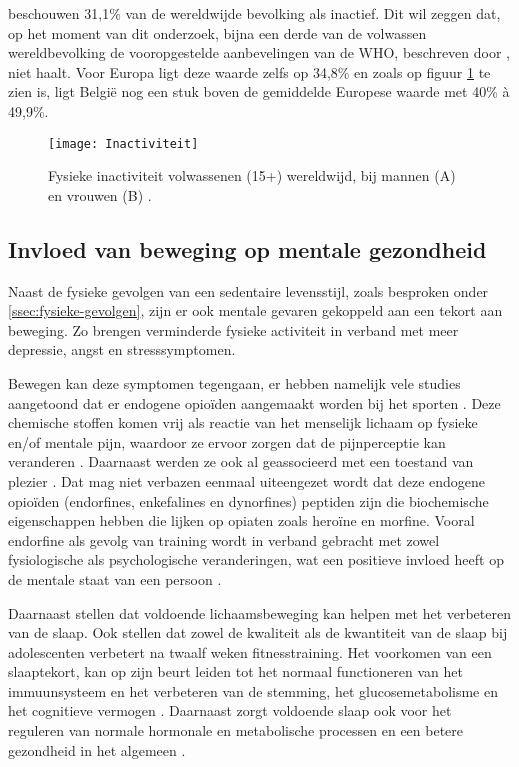 \textcite{Hallal2012} beschouwen 31,1\% van de wereldwijde bevolking als inactief. Dit wil zeggen dat, op het moment van dit onderzoek, bijna een derde van de volwassen wereldbevolking de vooropgestelde aanbevelingen van de WHO, beschreven door \textcite{Bull2020}, niet haalt. Voor Europa ligt deze waarde zelfs op 34,8\% en zoals op figuur \ref{fig:inactivity} te zien is, ligt België nog een stuk boven de gemiddelde Europese waarde met 40\% à 49,9\%.

\begin{figure}[h]
    \caption[Fysieke inactiviteit bij volwassenen wereldwijd]{Fysieke inactiviteit volwassenen (15+) wereldwijd, bij mannen (A) en vrouwen (B) \autocite{Bull2020}.}
    \texttt{[image: Inactiviteit]}
    \label{fig:inactivity}
\end{figure}

\subsection{Invloed van beweging op mentale gezondheid}
Naast de fysieke gevolgen van een sedentaire levensstijl, zoals besproken onder \ref{ssec:fysieke-gevolgen}, zijn er ook mentale gevaren gekoppeld aan een tekort aan beweging. Zo brengen \textcite{Stanton2020} verminderde fysieke activiteit in verband met meer depressie, angst en stresssymptomen.

Bewegen kan deze symptomen tegengaan, er hebben namelijk vele studies aangetoond dat er endogene opioïden aangemaakt worden bij het sporten \autocite{Harber1984}. Deze chemische stoffen komen vrij als reactie van het menselijk lichaam op fysieke en/of mentale pijn, waardoor ze ervoor zorgen dat de pijnperceptie kan veranderen \autocite{Chaudhry2023, Dishman2009}. Daarnaast werden ze ook al geassocieerd met een toestand van plezier \autocite{Chaudhry2023}.
Dat mag niet verbazen eenmaal uiteengezet wordt dat deze endogene opioïden (endorfines, enkefalines en dynorfines) peptiden zijn die biochemische eigenschappen hebben die lijken op opiaten zoals heroïne en morfine. Vooral endorfine als gevolg van training wordt in verband gebracht met zowel fysiologische als psychologische veranderingen, wat een positieve invloed heeft op de mentale staat van een persoon \autocite{Dishman2009}.

Daarnaast stellen \textcite{Mahindru2023} dat voldoende lichaamsbeweging kan helpen met het verbeteren van de slaap. Ook \textcite{Ghrouz2019} stellen dat zowel de kwaliteit als de kwantiteit van de slaap bij adolescenten verbetert na twaalf weken fitnesstraining. Het voorkomen van een slaaptekort, kan op zijn beurt leiden tot het normaal functioneren van het immuunsysteem en het verbeteren van de stemming, het glucosemetabolisme en het cognitieve vermogen \autocite{Mahindru2023}. Daarnaast zorgt voldoende slaap ook voor het reguleren van normale hormonale en metabolische processen en een betere gezondheid in het algemeen \autocite{Dolezal2017}.

